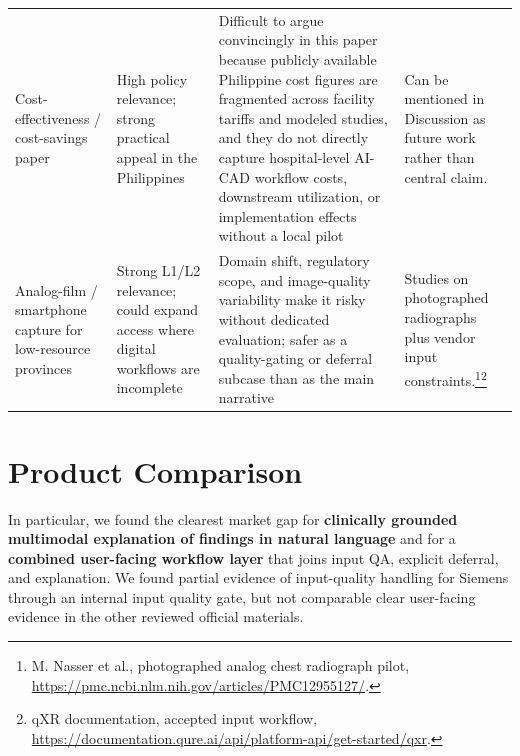 \documentclass[11pt]{article}
\begin{document}
\begin{longtable}{p{} p{} p{} p{}}
Cost-effectiveness / cost-savings paper & High policy relevance; strong practical appeal in the Philippines & Difficult to argue convincingly in this paper because publicly available Philippine cost figures are fragmented across facility tariffs and modeled studies, and they do not directly capture hospital-level AI-CAD workflow costs, downstream utilization, or implementation effects without a local pilot & Can be mentioned in Discussion as future work rather than central claim. \\

Analog-film / smartphone capture for low-resource provinces & Strong L1/L2 relevance; could expand access where digital workflows are incomplete & Domain shift, regulatory scope, and image-quality variability make it risky without dedicated evaluation; safer as a quality-gating or deferral subcase than as the main narrative & Studies on photographed radiographs plus vendor input constraints.\footnote{M. Nasser et al., photographed analog chest radiograph pilot, \url{https://pmc.ncbi.nlm.nih.gov/articles/PMC12955127/}.}\footnote{qXR documentation, accepted input workflow, \url{https://documentation.qure.ai/api/platform-api/get-started/qxr}.} \\
\bottomrule
\end{longtable}

\section{Product Comparison}

In particular, we found the clearest market gap for \textbf{clinically grounded multimodal explanation of findings in natural language} and for a \textbf{combined user-facing workflow layer} that joins input QA, explicit deferral, and explanation. We found partial evidence of input-quality handling for Siemens through an internal input quality gate, but not comparable clear user-facing evidence in the other reviewed official materials.
\end{document}
